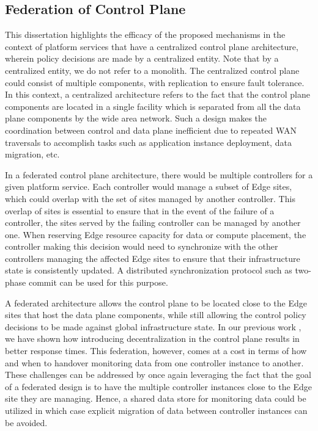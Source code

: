 \subsection{Federation of Control Plane}
This dissertation highlights the efficacy of the proposed mechanisms in the context of platform services that have a centralized control plane architecture, wherein policy decisions are made by a centralized entity. Note that by a centralized entity, we do not refer to a monolith. The centralized control plane could consist of multiple components, with replication to ensure fault tolerance. In this context, a centralized architecture refers to the fact that the control plane components are located in a single facility which is separated from all the data plane components by the wide area network. Such a design makes the coordination between control and data plane inefficient due to repeated WAN traversals to accomplish tasks such as application instance deployment, data migration, etc.
\par In a federated control plane architecture, there would be multiple controllers for a given platform service. Each controller would manage a subset of Edge sites, which could overlap with the set of sites managed by another controller. This overlap of sites is essential to ensure that in the event of the failure of a controller, the sites served by the failing controller can be managed by another one. When reserving Edge resource capacity for data or compute placement, the controller making this decision would need to synchronize with the other controllers managing the affected Edge sites to ensure that their infrastructure state is consistently updated. A distributed synchronization protocol such as two-phase commit can be used for this purpose.
\par A federated architecture allows the control plane to be located close to the Edge sites that host the data plane components, while still allowing the control policy decisions to be made against global infrastructure state. In our previous work \cite{oneedge}, we have shown how introducing decentralization in the control plane results in better response times. This federation, however, comes at a cost in terms of how and when to handover monitoring data from one controller instance to another. These challenges can be addressed by once again leveraging the fact that the goal of a federated design is to have the multiple controller instances close to the Edge site they are managing. Hence, a shared data store for monitoring data could be utilized in which case explicit migration of data between controller instances can be avoided.

